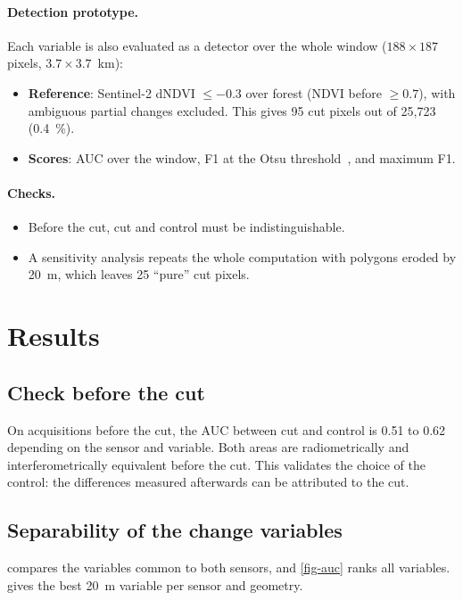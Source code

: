\documentclass[11pt,a4paper]{article}
\begin{document}
\paragraph{Detection prototype.} Each variable is also evaluated as a detector over the whole window
($188\times187$ pixels, $3.7\times3.7$~km):
\begin{itemize}
\item \textbf{Reference}: Sentinel-2 dNDVI $\leq -0.3$ over forest (NDVI before $\geq 0.7$), with ambiguous
  partial changes excluded. This gives 95 cut pixels out of 25,723 (0.4~\%).
\item \textbf{Scores}: AUC over the window, F1 at the Otsu threshold~\cite{otsu1979threshold}, and maximum F1.
\end{itemize}

\paragraph{Checks.}
\begin{itemize}
\item Before the cut, cut and control must be indistinguishable.
\item A sensitivity analysis repeats the whole computation with polygons eroded by 20~m, which leaves 25
  \enquote{pure} cut pixels.
\end{itemize}

\section{Results}

\subsection{Check before the cut}

On acquisitions before the cut, the AUC between cut and control is 0.51 to 0.62 depending on the sensor and
variable. Both areas are radiometrically and interferometrically equivalent before the cut. This validates the
choice of the control: the differences measured afterwards can be attributed to the cut.

\subsection{Separability of the change variables}

 compares the variables common to both sensors, and \cref{fig-auc} ranks all variables.
 gives the best 20~m variable per sensor and geometry.
\end{document}
